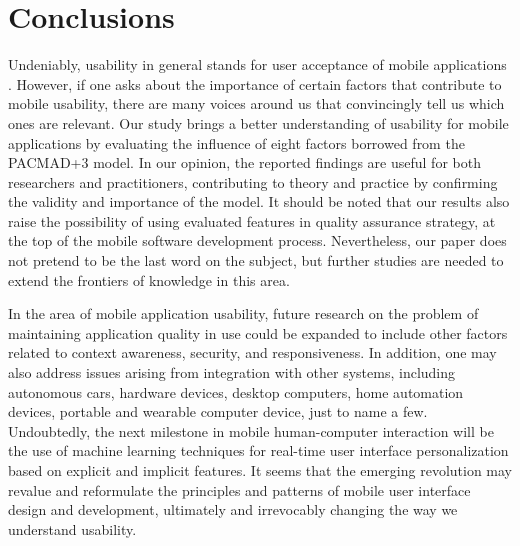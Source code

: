 \documentclass[preprint,12pt]{elsarticle}
\begin{document}
\section{Conclusions}
Undeniably, usability in general stands for user acceptance of mobile applications \cite{alqahtani2015investigation, hajesmaeel2022most, camilleri2023functionality}. However, if one asks about the importance of certain factors that contribute to mobile usability, there are many voices around us that convincingly tell us which ones are relevant. 
Our study brings a better understanding of usability for mobile applications by evaluating the influence of eight factors borrowed from the PACMAD+3 model. In our opinion, the reported findings are useful for both researchers and practitioners, contributing to theory and practice by confirming the validity and importance of the model. It should be noted that our results also raise the possibility of using evaluated features in quality assurance strategy, at the top of the mobile software development process. Nevertheless, our paper does not pretend to be the last word on the subject, but further studies are needed to extend the frontiers of knowledge in this area. 

In the area of mobile application usability, future research on the problem of maintaining application quality in use could be expanded to include other factors related to context awareness, security, and responsiveness. In addition, one may also address issues arising from integration with other systems, including autonomous cars, hardware devices, desktop computers, home automation devices, portable and wearable computer device, just to name a few.  
Undoubtedly, the next milestone in mobile human-computer interaction will be the use of machine learning techniques for real-time user interface personalization based on explicit and implicit features. It seems that the emerging revolution may revalue and reformulate the principles and patterns of mobile user interface design and development, ultimately and irrevocably changing the way we understand usability.
\end{document}

